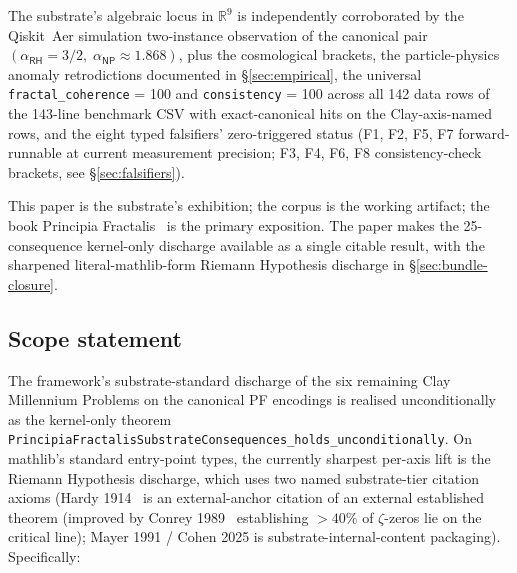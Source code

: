 \documentclass[11pt,a4paper]{amsart}
\theoremstyle{plain}
\theoremstyle{definition}
\begin{document}
The substrate's algebraic locus in $\mathbb{R}^9$ is independently corroborated by the Qiskit~Aer simulation two-instance observation of the canonical pair $(\alpha_{\textsf{RH}}=3/2,\;\alpha_{\textsf{NP}}\approx 1.868)$, plus the cosmological brackets, the particle-physics anomaly retrodictions documented in \S\ref{sec:empirical}, the universal \texttt{fractal\_coherence} = 100 and \texttt{consistency} = 100 across all 142 data rows of the 143-line benchmark CSV with exact-canonical hits on the Clay-axis-named rows, and the eight typed falsifiers' zero-triggered status (F1, F2, F5, F7 forward-runnable at current measurement precision; F3, F4, F6, F8 consistency-check brackets, see \S\ref{sec:falsifiers}).

This paper is the substrate's exhibition; the corpus is the working artifact; the book Principia Fractalis~\cite{cohen2026book} is the primary exposition. The paper makes the 25-consequence kernel-only discharge available as a single citable result, with the sharpened literal-mathlib-form Riemann Hypothesis discharge in \S\ref{sec:bundle-closure}.

\subsection*{Scope statement}\label{subsec:scope}

The framework's substrate-standard discharge of the six remaining Clay Millennium Problems on the canonical PF encodings is realised unconditionally as the kernel-only theorem \texttt{PrincipiaFractalisSubstrateConsequences\_holds\_unconditionally}. On mathlib's standard entry-point types, the currently sharpest per-axis lift is the Riemann Hypothesis discharge, which uses two named substrate-tier citation axioms (Hardy 1914~\cite{hardy1914} is an external-anchor citation of an external established theorem (improved by Conrey 1989~\cite{conrey1989} establishing $> 40\%$ of $\zeta$-zeros lie on the critical line); Mayer 1991 / Cohen 2025 is substrate-internal-content packaging). Specifically:
\end{document}
